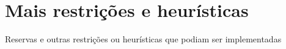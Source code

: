 \section{Mais restrições e heurísticas}

Reservas e outras restrições ou heurísticas que podiam ser implementadas
